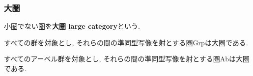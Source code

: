 \subsubsection{大圏}
\begin{Def}
小圏でない圏を{\bf 大圏 large category}という.
\end{Def}
\begin{comment}*************************
\begin{Prop}
すべての小集合\footnote{「宇宙」で定義しているが, 現在本文から外している}を対象とし, それらの間の写像を射とする圏$\mathrm{Set}$は大圏である.
\end{Prop}
***************************\end{comment}
\begin{Prop}
すべての群を対象とし, それらの間の準同型写像を射とする圏$\mathrm{Grp}$は大圏である.
\end{Prop}
\begin{Prop}
すべてのアーベル群を対象とし, それらの間の準同型写像を射とする圏$\mathrm{Ab}$は大圏である.
\end{Prop}
\begin{comment}*************************
\begin{Prop}
すべての位相空間\footnote{定義を本文から外している}を対象とし, それらの間の連続写像\footnote{定義を本文から外している}を射とする圏$\mathrm{Top}$は大圏である.
\end{Prop}
\end{comment}
\begin{comment}*************************
\begin{example}
ある体\footnote{定義を本文から外している}$k$に対して,
すべての$k$次線形空間\footnote{未定義}を対象とし,
それらの間の$k$次線形写像\footnote{未定義}を射とする
圏$\mathrm{Vect}_k$は大圏である.
\end{example}
***************************\end{comment}
\begin{comment}*************************
\subsection{部分圏}
\begin{Notation}
圏$C$における射$f,g\in\mathrm{Mor}(\mathscr{C})$の合成を$g\circ_{\mathscr{C}}f$で表す.
\end{Notation}
\begin{Def}
圏$\mathscr{A}$が圏$\mathscr{B}$に対して, 以下の条件を満たすとき, {\bf $\mathscr{A}$は$\mathscr{B}$の部分圏である}という.
\begin{enumerate}
\item $\mathrm{Obj}(\mathscr{A})\subset\mathrm{Obj}(\mathscr{B})$
\item $\mathscr{A}$の2つの対象の組の全体が,
$\mathscr{B}$の2つの対象の組の全体の部分集合である.
\item ...
\end{enumerate}
\end{Def}
\begin{Prop}
圏$\mathrm{Ab}$は圏$\mathrm{Grp}$の部分圏である.
\end{Prop}

***************************\end{comment}

